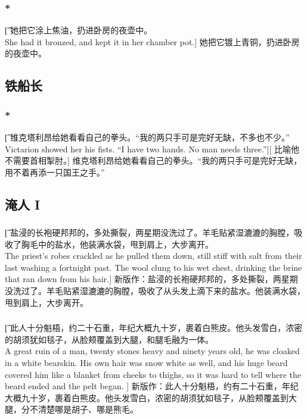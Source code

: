 \documentclass[12pt,a4paper]{article}
\begin{document}
\subsubsection{\color{red}*}\t[
	她把它涂上焦油，扔进卧房的夜壶中。\\
	She had it bronzed, and kept it in her chamber pot.]
	她把它镀上青铜，扔进卧房的夜壶中。
		
\subsection{铁船长}
\subsubsection{\color{red}*}\t[
	维克塔利昂给她看看自己的拳头。“我的两只手可是完好无缺，不多也不少。”\\
	Victarion showed her his fists. “I have two hands. No man needs three.”][
	比喻他不需要首相掣肘。]
	维克塔利昂给她看看自己的拳头。“我的两只手可是完好无缺，用不着再添一只国王之手。”
	
\subsection{淹人 I}
\subsubsection{}\t[
	盐浸的长袍硬邦邦的，多处撕裂，两星期没洗过了。羊毛贴紧湿漉漉的胸膛，吸收了胸毛中的盐水，他装满水袋，甩到肩上，大步离开。\\
	The priest's robes crackled as he pulled them down, still stiff with salt from their last washing a fortnight past. The wool clung to his wet chest, drinking the brine that ran down from his hair.]
	新版作：盐浸的长袍硬邦邦的，多处撕裂，两星期没洗过了。羊毛贴紧湿漉漉的胸膛，吸收了从头发上滴下来的盐水。他装满水袋，甩到肩上，大步离开。
	
\subsubsection{}\t[
	此人十分魁梧，约二十石重，年纪大概九十岁，裹着白熊皮。他头发雪白，浓密的胡须犹如毯子，从脸颊覆盖到大腿，和腿毛融为一体。\\
	A great ruin of a man, twenty stones heavy and ninety years old, he was cloaked in a white bearskin. His own hair was snow white as well, and his huge beard covered him like a blanket from cheeks to thighs, so it was hard to tell where the beard ended and the pelt began. ]
	新版作：此人十分魁梧，约有二十石重，年纪大概九十岁，裹着白熊皮。他头发雪白，浓密的胡须犹如毯子，从脸颊覆盖到大腿，分不清楚哪是胡子、哪是熊毛。
	
\end{document}
